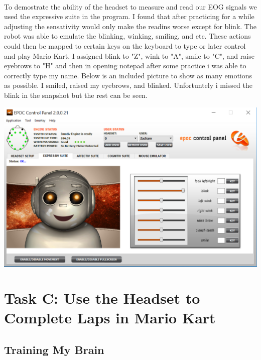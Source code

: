\documentclass[12pt]{article}
\begin{document}
		\paragraph{}
			To demostrate the ability of the headset to measure and read our EOG signals we used the 
			expressive suite in the program. I found that after practicing for a while adjusting the 
			sensativity would only make the readins worse except for blink.  The robot was able to 
			emulate the blinking, winking, smiling, and etc. These actions could then be mapped to 
			certain keys on the keyboard to type or later control and play Mario Kart. I assigned 
			blink to "Z", wink to "A", smile to "C", and raise eyebrows to "H" and then in opening 
			notepad after some practice i was able to correctly type my name.  Below is an included 
			picture to show as many emotions as possible. I smiled, raised my eyebrows, and blinked.
			Unfortuntely i missed the blink in the snapshot but the rest can be seen.

			\begin{center}
				\includegraphics[scale=0.5]{express.png}\\
 			\end{center}

 	\section{Task C: Use the Headset to Complete Laps in Mario Kart}
 		\subsection{Training My Brain}
\end{document}
